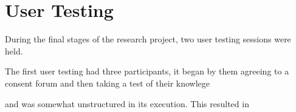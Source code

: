 \section{User Testing}
During the final stages of the research project, two user testing sessions were held. 

The first user testing had three participants, it began by them agreeing to a consent forum and then taking a test of their knowlege


and was somewhat unstructured in its execution. This resulted in 